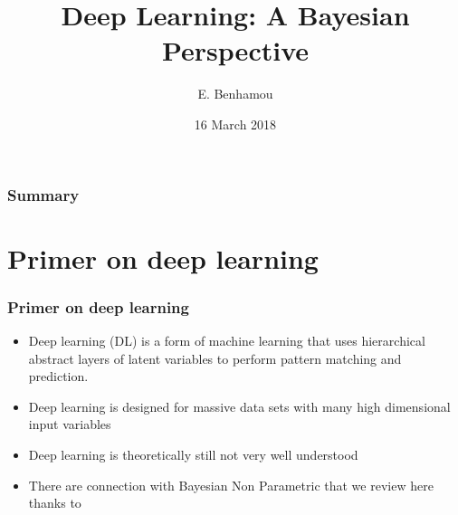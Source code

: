 \documentclass{beamer}
\title[Deep Learning: A Bayesian Perspective]{Deep Learning: A Bayesian Perspective} %
\author{
E. Benhamou\\
} %
\institute[Université Dauphine] %
{
Article Reading for Bayesian Nonparametrics\\
Julyan Arbel's course \\
M2 MASH \\
Université Paris Dauphine %
}
\date{16 March 2018} %
\begin{document}
\begin{frame}
\titlepage %
\end{frame}

\begin{frame}
\frametitle{Summary} %
\tableofcontents %
\end{frame}


\section{Primer on deep learning} 
\begin{frame}
\frametitle{Primer on deep learning}
\begin{itemize}
\item Deep learning (DL) is a form of machine learning that uses hierarchical abstract layers of latent
variables to perform pattern matching and prediction.
\item Deep learning is designed for massive data sets with many high dimensional input variables
\item Deep learning is theoretically still not very well understood
\item There are connection with Bayesian Non Parametric that we review here thanks to \cite{Polson 2017}
\end{itemize}
\end{frame}

\end{document}
